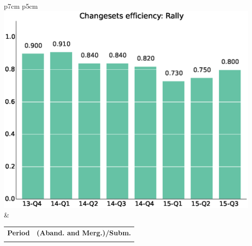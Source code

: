 \documentclass[a4wide,11pt]{article}
\begin{document}
\begin{tabular}{p{7cm} p{5cm}}
    \vspace{0pt} 
    \includegraphics[scale=.35]{figs/bmiscrRally.eps}
    & 
    \vspace{0pt}
    \begin{tabular}{l|l}%
    \bfseries Period & \bfseries (Aband. and Merg.)/Subm. %
    \csvreader[head to column names]{data/submitted_reviewsRally.csv}{}%
    {\\ & \bmi}
    \end{tabular}
\end{tabular}
\end{document}
